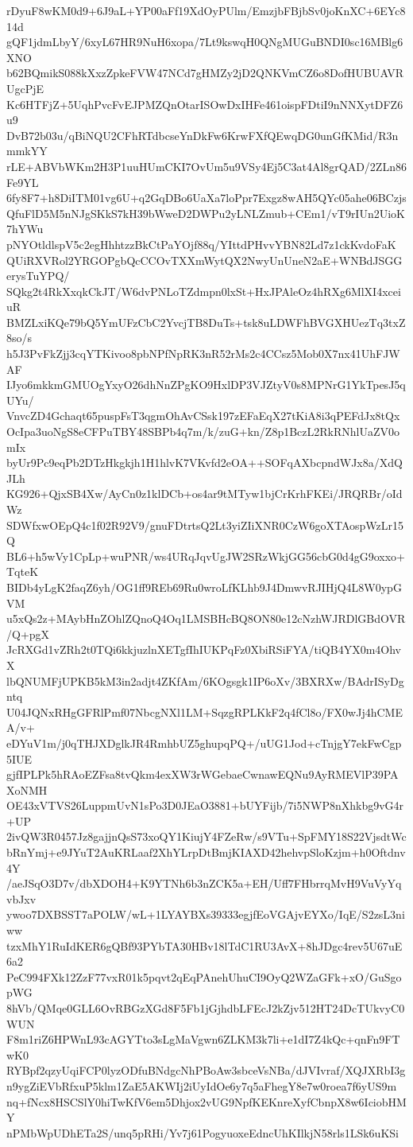 rDyuF8wKM0d9+6J9aL+YP00aFf19XdOyPUlm/EmzjbFBjbSv0joKnXC+6EYc814d
gQF1jdmLbyY/6xyL67HR9NuH6xopa/7Lt9kswqH0QNgMUGuBNDI0sc16MBlg6XNO
b62BQmikS088kXxzZpkeFVW47NCd7gHMZy2jD2QNKVmCZ6o8DofHUBUAVRUgcPjE
Kc6HTFjZ+5UqhPvcFvEJPMZQnOtarISOwDxIHFe461oispFDtiI9nNNXytDFZ6u9
DvB72b03u/qBiNQU2CFhRTdbcseYnDkFw6KrwFXfQEwqDG0unGfKMid/R3nmmkYY
rLE+ABVbWKm2H3P1uuHUmCKI7OvUm5u9VSy4Ej5C3at4Al8grQAD/2ZLn86Fe9YL
6fy8F7+h8DiITM01vg6U+q2GqDBo6UaXa7loPpr7Exgz8wAH5QYc05ahe06BCzjs
QfuFlD5M5nNJgSKkS7kH39bWweD2DWPu2yLNLZmub+CEm1/vT9rIUn2UioK7hYWu
pNYOtldlspV5c2egHhhtzzBkCtPaYOjf88q/YIttdPHvvYBN82Ld7z1ckKvdoFaK
QUiRXVRol2YRGOPgbQcCCOvTXXmWytQX2NwyUnUneN2aE+WNBdJSGGerysTuYPQ/
SQkg2t4RkXxqkCkJT/W6dvPNLoTZdmpn0lxSt+HxJPAleOz4hRXg6MlXI4xceiuR
BMZLxiKQe79bQ5YmUFzCbC2YvcjTB8DuTs+tsk8uLDWFhBVGXHUezTq3txZ8so/s
h5J3PvFkZjj3cqYTKivoo8pbNPfNpRK3nR52rMs2c4CCsz5Mob0X7nx41UhFJWAF
IJyo6mkkmGMUOgYxyO26dhNnZPgKO9HxlDP3VJZtyV0s8MPNrG1YkTpesJ5qUYu/
VnvcZD4Gchaqt65puspFsT3qgmOhAvCSsk197zEFaEqX27tKiA8i3qPEFdJx8tQx
OcIpa3uoNgS8eCFPuTBY48SBPb4q7m/k/zuG+kn/Z8p1BczL2RkRNhlUaZV0omIx
byUr9Pc9eqPb2DTzHkgkjh1H1hlvK7VKvfd2eOA++SOFqAXbcpndWJx8a/XdQJLh
KG926+QjxSB4Xw/AyCn0z1klDCb+os4ar9tMTyw1bjCrKrhFKEi/JRQRBr/oIdWz
SDWfxwOEpQ4c1f02R92V9/gnuFDtrtsQ2Lt3yiZIiXNR0CzW6goXTAospWzLr15Q
BL6+h5wVy1CpLp+wuPNR/ws4URqJqvUgJW2SRzWkjGG56cbG0d4gG9oxxo+TqteK
BIDb4yLgK2faqZ6yh/OG1ff9REb69Ru0wroLfKLhb9J4DmwvRJIHjQ4L8W0ypGVM
u5xQs2z+MAybHnZOhlZQnoQ4Oq1LMSBHcBQ8ON80e12cNzhWJRDlGBdOVR/Q+pgX
JcRXGd1vZRh2t0TQi6kkjuzlnXETgfIhIUKPqFz0XbiRSiFYA/tiQB4YX0m4OhvX
lbQNUMFjUPKB5kM3in2adjt4ZKfAm/6KOgsgk1IP6oXv/3BXRXw/BAdrISyDgntq
U04JQNxRHgGFRlPmf07NbcgNXl1LM+SqzgRPLKkF2q4fCl8o/FX0wJj4hCMEA/v+
eDYuV1m/j0qTHJXDglkJR4RmhbUZ5ghupqPQ+/uUG1Jod+cTnjgY7ekFwCgp5IUE
gjfIPLPk5hRAoEZFsa8tvQkm4exXW3rWGebaeCwnawEQNu9AyRMEVlP39PAXoNMH
OE43xVTVS26LuppmUvN1sPo3D0JEaO3881+bUYFijb/7i5NWP8nXhkbg9vG4r+UP
2ivQW3R0457Jz8gajjnQsS73xoQY1KiujY4FZeRw/s9VTu+SpFMY18S22VjsdtWc
bRnYmj+e9JYuT2AuKRLaaf2XhYLrpDtBmjKIAXD42hehvpSloKzjm+h0Oftdnv4Y
/aeJSqO3D7v/dbXDOH4+K9YTNh6b3nZCK5a+EH/Uff7FHbrrqMvH9VuVyYqvbJxv
ywoo7DXBSST7aPOLW/wL+1LYAYBXs39333egjfEoVGAjvEYXo/IqE/S2zsL3niww
tzxMhY1RuIdKER6gQBf93PYbTA30HBv18lTdC1RU3AvX+8hJDgc4rev5U67uE6a2
PeC994FXk12ZzF77vxR01k5pqvt2qEqPAnehUhuCI9OyQ2WZaGFk+xO/GuSgopWG
8hVb/QMqe0GLL6OvRBGzXGd8F5Fb1jGjhdbLFEcJ2kZjv512HT24DcTUkvyC0WUN
F8m1riZ6HPWnL93cAGYTto3sLgMaVgwn6ZLKM3k7li+e1dI7Z4kQc+qnFn9FTwK0
RYBpf2qzyUqiFCP0lyzODfuBNdgcNhPBoAw3sbceVsNBa/dJVIvraf/XQJXRbI3g
n9ygZiEVbRfxuP5klm1ZaE5AKWIj2iUyIdOe6y7q5aFhegY8e7w0roea7f6yUS9m
nq+fNcx8HSCSlY0hiTwKfV6em5Dhjox2vUG9NpfKEKnreXyfCbnpX8w6IciobHMY
nPMbWpUDhETa2S/unq5pRHi/Yv7j61PogyuoxeEdncUhKIlkjN58rls1LSk6uKSi
